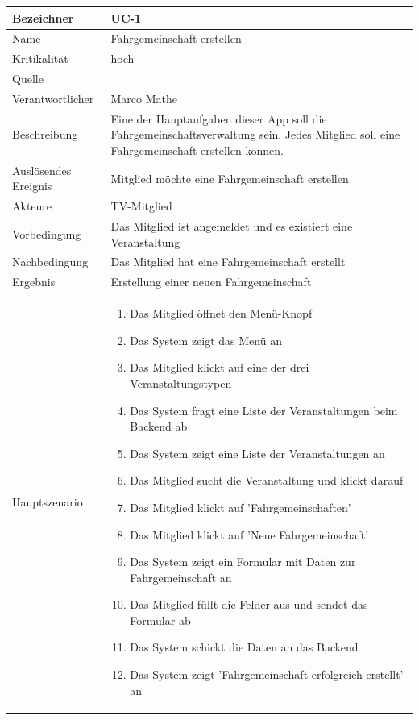 \begin{table}[ht]
\centering
  \begin{tabular}{ l | p{10cm} }
	\hline
	\rowcolor{gray}
	Bezeichner		&	UC-1\\ \hline
	Name			&	Fahrgemeinschaft erstellen\\ \hline
	Kritikalität		&	hoch\\ \hline
	Quelle			&	\glossarmark{Stakeholder}\\ \hline
	Verantwortlicher	&	Marco Mathe\\ \hline
	Beschreibung	&	Eine der Hauptaufgaben dieser App soll die Fahrgemeinschaftsverwaltung sein. Jedes Mitglied soll eine Fahrgemeinschaft erstellen können.\\ \hline
	Auslösendes Ereignis&	Mitglied möchte eine Fahrgemeinschaft erstellen\\ \hline
	Akteure		&	TV-Mitglied\\ \hline
	Vorbedingung	&	Das Mitglied ist angemeldet und es existiert eine Veranstaltung\\ \hline
	Nachbedingung	&	Das Mitglied hat eine Fahrgemeinschaft erstellt\\ \hline
	Ergebnis		&	Erstellung einer neuen Fahrgemeinschaft\\ \hline
	Hauptszenario	&	\begin{enumerate}
					\item Das Mitglied öffnet den Menü-Knopf
					\item Das System zeigt das Menü an
					\item Das Mitglied klickt auf eine der drei Veranstaltungstypen
					\item Das System fragt eine Liste der Veranstaltungen beim Backend ab
					\item Das System zeigt eine Liste der Veranstaltungen an
					\item Das Mitglied sucht die Veranstaltung und klickt darauf
					\item Das Mitglied klickt auf 'Fahrgemeinschaften'
					\item Das Mitglied klickt auf 'Neue Fahrgemeinschaft'
					\item Das System zeigt ein Formular mit Daten zur Fahrgemeinschaft an
					\item Das Mitglied füllt die Felder aus und sendet das Formular ab
					\item Das System schickt die Daten an das Backend
					\item Das System zeigt 'Fahrgemeinschaft erfolgreich erstellt' an

\end{enumerate}
\end{tabular}
\end{table}
